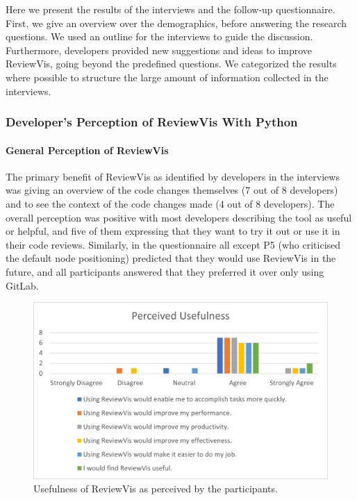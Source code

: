 \documentclass[a4paper,11pt,twoside]{article}
\theoremstyle{definition} %
\begin{document}
Here we present the results of the interviews and the follow-up questionnaire. First, we give an overview over the demographics, before answering the research questions. We used an outline for the interviews to guide the discussion. Furthermore, developers provided new suggestions and ideas to improve ReviewVis, going beyond the predefined questions. We categorized the results where possible to structure the large amount of information collected in the interviews.


\subsubsection{Developer’s Perception of ReviewVis With Python} \label{SubSubSec:RQ1.1}

\paragraph{General Perception of ReviewVis} \label{Par:OverallImpressions}
The primary benefit of ReviewVis as identified by developers in the interviews was giving an overview of the code changes themselves (7 out of 8 developers) and to see the context of the code changes made (4 out of 8 developers). The overall perception was positive with most developers describing the tool as useful or helpful, and five of them expressing that they want to try it out or use it in their code reviews. Similarly, in the questionnaire all except P5 (who criticised the default node positioning) predicted that they would use ReviewVis in the future, and all participants answered that they preferred it over only using GitLab.

\begin{figure}[h]
    \centering
    \includegraphics[width=1.0\textwidth]{Subfigures/perceived_usefulness.png}
    \caption{Usefulness of ReviewVis as perceived by the participants.}
    \label{fig:PerceivedUsefulness}
\end{figure}
\end{document}
